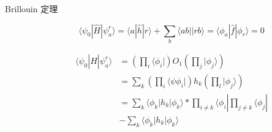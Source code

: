 \documentclass{article}
\numberwithin{equation}{section}
\newcommand{\bra}[1]{\langle #1 |}
\newcommand{\ket}[1]{| #1 \rangle}
\newcommand{\bracketl}[3]{\langle #1 | #2 | #3 \rangle}
\begin{document}
\begin{description}
    \item[Brillouin 定理]
    \begin{equation}
    \bracketl{\psi_0}{\hat{H}}{\psi_a^r}=\bracketl{a}{\hat{h}}{r}+\sum_b\bra{ab}\ket{rb}=\bracketl{\phi_a}{\hat{f}}{\phi_r}=0
    \end{equation}
  
    \begin{align*}
    \bracketl{\psi_0}{\hat{H}}{\psi_a^r}&=(\prod_i\bra{\phi_i})O_1(\prod_j\ket{\phi_j})\\
    &=\sum_k(\prod_i\bra{\psi{\phi_i}})h_k(\prod_l\ket{\phi_j})\\
    &=\sum_k \bracketl{\phi_k}{h_k}{\phi_k}*\prod_{i \neq k} \bra{\phi_i} \prod_{j \neq k} \bra{\phi_j}\\
    &-\sum_k \bracketl{\phi_k}{h_k}{\phi_k}
    \end{align*}
  \end{description}
  
\end{document}
